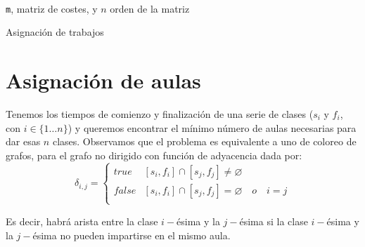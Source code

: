 \documentclass[a4paper, 11pt]{article} %
\let\emptyset\varnothing
\begin{document}
		\begin{algorithm}[H]
			\begin{algorithmic}[1]
				\REQUIRE \ \\
					\texttt{m}, matriz de costes, y $n$ orden de la matriz\\
			           	     \ENDIF
			           	   \ENDIF
			             \ENDFOR
			           \ENDIF
			         \ENDFOR
			       \ENDFOR  	
				        
			\end{algorithmic}
			   \caption{Asignación de trabajos}
			   \label{Asignación Global}
		\end{algorithm}
\section{Asignación de aulas}
Tenemos los tiempos de comienzo y finalización de una serie de clases
($s_i$ y $f_i$, con $i\in\{1\ldots n\}$) y queremos encontrar el mínimo número de aulas necesarias
para dar esas $n$ clases.
Observamos que el problema es equivalente a uno de coloreo de grafos, para
el grafo no dirigido con función de adyacencia dada por:
$$\delta_{i,j}=\left\{\begin{array}{ll}
  true  & [s_i,f_i] \cap [s_j,f_j] \neq \emptyset \\
  false  & [s_i,f_i]\cap[s_j,f_j] = \emptyset\quad o\quad i=j\\
  \end{array}\right.$$

Es decir, habrá arista entre la clase $i-$ésima y la $j-$ésima si la
clase $i-$ésima y la $j-$ésima no pueden impartirse en el mismo aula.
\end{document}
